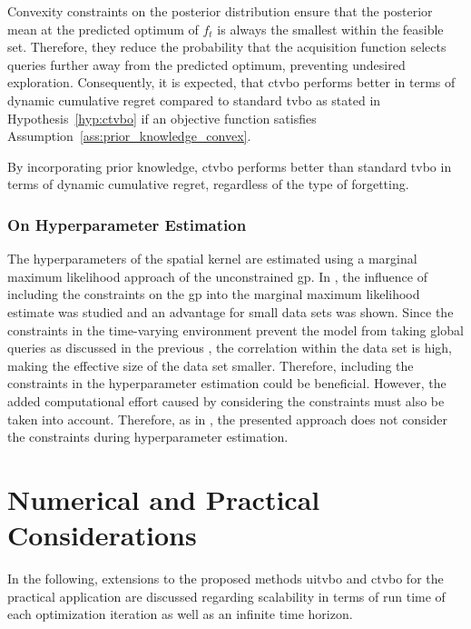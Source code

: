 Convexity constraints on the posterior distribution ensure that the posterior mean at the predicted optimum of $f_t$ is always the smallest within the feasible set.
Therefore, they reduce the probability that the acquisition function selects queries further away from the predicted optimum, preventing undesired exploration. Consequently, it is expected, that \gls{ctvbo} performs better in terms of dynamic cumulative regret compared to standard \gls{tvbo} as stated in Hypothesis~\ref{hyp:ctvbo} if an objective function satisfies Assumption~\ref{ass:prior_knowledge_convex}.

\begin{hyp}
By incorporating prior knowledge, \gls{ctvbo} performs better than standard \gls{tvbo} in terms of dynamic cumulative regret, regardless of the type of forgetting.
\label{hyp:ctvbo}
\end{hyp}

\subsubsection{On Hyperparameter Estimation}

The hyperparameters of the spatial kernel are estimated using a marginal maximum likelihood approach of the unconstrained \gls{gp}. In \textcite{Bachoc_2019}, the influence of including the constraints on the \gls{gp} into the marginal maximum likelihood estimate was studied and an advantage for small data sets was shown. Since the constraints in the time-varying environment prevent the model from taking global queries as discussed in the previous , the correlation within the data set is high, making the effective size of the data set smaller. Therefore, including the constraints in the hyperparameter estimation could be beneficial. However, the added computational effort caused by considering the constraints must also be taken into account. Therefore, as in \textcite{Agrell_2019}, the presented approach does not consider the constraints during hyperparameter estimation.


\section{Numerical and Practical Considerations}
\label{sec:extensions}

In the following, extensions to the proposed methods \gls{uitvbo} and \gls{ctvbo} for the practical application are discussed regarding scalability in terms of run time of each optimization iteration as well as an infinite time horizon.

